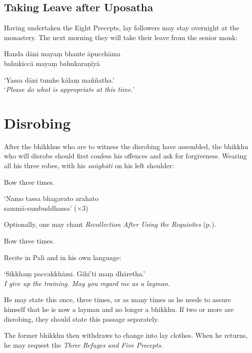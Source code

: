 \subsection{Taking Leave after Uposatha}

Having undertaken the Eight Precepts, lay followers may stay overnight at the monastery. The next
morning they will take their leave from the senior monk:


Handa dāni mayaṃ bhante āpucchāma\\
bahukiccā mayaṃ bahukaraṇīyā


‘Yassa dāni tumhe kālaṃ maññatha.’\\
‘\emph{Please do what is appropriate at this time.}’

\section{Disrobing}

After the bhikkhus who are to witness the disrobing have assembled, the bhikkhu
who will disrobe should first confess his offences and ask for forgiveness. Wearing all his three
robes, with his \emph{saṅghāti} on his left shoulder:

Bow three times.

‘Namo tassa bhagavato arahato\\
sammā-sambuddhassa’ (×3)

Optionally, one may chant \emph{Recollection After Using the Requisites}
(p.\pageref{recollection-after-using}).

Bow three times.

Recite in Pali and in his own language:

‘Sikkhaṃ paccakkhāmi. Gihī'ti maṃ dhāretha.’\\
\emph{I give up the training. May you regard me as a layman.}

He may state this once, three times, or as many times as he needs to assure
himself that he is now a layman and no longer a bhikkhu. If two or more are
disrobing, they should state this passage separately.

The former bhikkhu then withdraws to change into lay clothes. When he returns,
he may request the \emph{Three Refuges and Five Precepts}.

